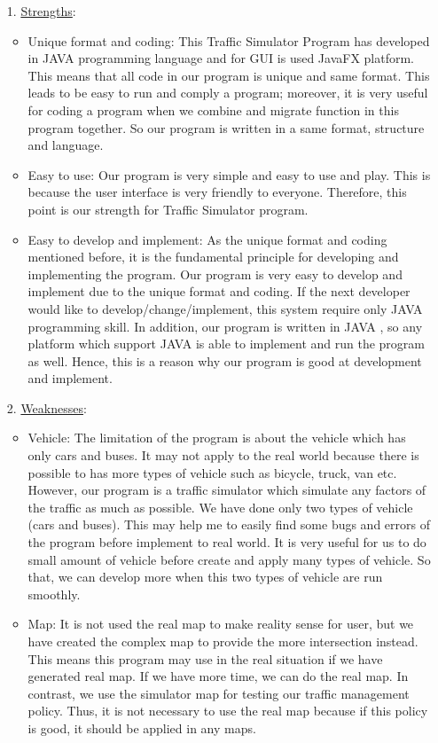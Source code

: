 \documentclass[11pt]{article}
\begin{document}
	\begin{itemize}
		\item[1. ]\underline{Strengths}: 
		\begin{itemize}
			\item{} Unique format and coding: This Traffic Simulator Program has developed in JAVA  programming language and for GUI is used JavaFX platform. This means that all code in our program is unique and same format. This leads to be easy to run and comply a program; moreover, it is very useful for coding a program when we combine and migrate function in this program together. So  our program is written in a same format, structure and language.
			\item{} Easy to use: Our program is very simple and easy to use and play. This is because  the user interface is very friendly to everyone. Therefore, this point is our strength for Traffic Simulator program.
			\item{} Easy to develop and implement: As the unique format and coding mentioned before, it is the fundamental principle for developing and implementing the program. Our program is very easy to develop and implement due to the unique format and coding. If the next developer would like to develop/change/implement, this system require only JAVA programming skill. In addition, our program is written in JAVA , so any platform which support JAVA is able to implement and run the program as well. Hence, this is a reason why our program is good at development and implement.   
  		\end{itemize}				

		\item[2. ] \underline{Weaknesses}:
		\begin{itemize}
			\item{} Vehicle: The limitation of the program is about the vehicle which has only cars and buses. It may not apply to the real world because there is possible to has more types of vehicle such as bicycle, truck, van etc. However, our program is a traffic simulator which simulate any factors of the traffic as much as possible. We have done only two types of vehicle (cars and buses). This may help me to easily find some bugs and errors of the program before implement to real world. It is very useful for us to do small amount of vehicle before create and apply many types of vehicle. So that, we can develop more when this two types of vehicle are run smoothly.      
			\item{} Map: It is not used the real map to make reality sense for user, but we have created the complex map to provide the more intersection instead. This means this program may use in the real situation if we have generated real map. If we have more time, we can do the real map. In contrast, we use the simulator map for testing our traffic management policy. Thus, it is not necessary to use the real map because if this policy is good, it should be applied in any maps. 
  		\end{itemize}					


\end{itemize}
\end{document}
